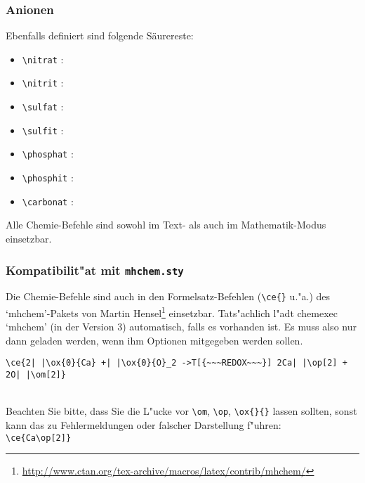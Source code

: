 \documentclass[a4paper,10pt,headsepline]{scrartcl}
\newcommand{\CEx}[1][8]{%
{\color{dunkelrot}\fontfamily{pag}\fontsize{#1}{#1}\selectfont chemexec}\xspace
}
\begin{document}
\subsubsection{Anionen}
Ebenfalls definiert sind folgende S\"aurereste:
\begin{itemize}
 \item \verb=\nitrat= : \nitrat
 \item \verb=\nitrit= : \nitrit
 \item \verb=\sulfat= : \sulfat
 \item \verb=\sulfit= : \sulfit
 \item \verb=\phosphat= : \phosphat
 \item \verb=\phosphit= : \phosphit
 \item \verb=\carbonat= : \carbonat
\end{itemize}
Alle Chemie-Befehle sind sowohl im Text- als auch im Mathematik-Modus einsetzbar.

\subsubsection{Kompatibilit"at mit \texttt{mhchem.sty}}
Die Chemie-Befehle sind auch in den Formelsatz-Befehlen (\verb=\ce{}= u."a.) des `mhchem'-Pakets von Martin Hensel\footnote{\url{http://www.ctan.org/tex-archive/macros/latex/contrib/mhchem/}} einsetzbar. Tats"achlich l"adt \CEx `mhchem' (in der Version 3) automatisch, falls es vorhanden ist. Es muss also nur dann geladen werden, wenn ihm Optionen mitgegeben werden sollen.
\begin{lstlisting}[numbers=none,basicstyle=\normalsize\ttfamily,showspaces=true]
 \ce{2| |\ox{0}{Ca} +| |\ox{0}{O}_2 ->T[{~~~REDOX~~~}] 2Ca| |\op[2] + 2O| |\om[2]}
\end{lstlisting}
\\
Beachten Sie bitte, dass Sie die L"ucke vor \verb=\om=, \verb=\op=, \verb=\ox{}{}= lassen sollten, sonst kann das zu Fehlermeldungen oder falscher Darstellung f"uhren:\\
\verb=\ce{Ca\op[2]}=  
\end{document}

